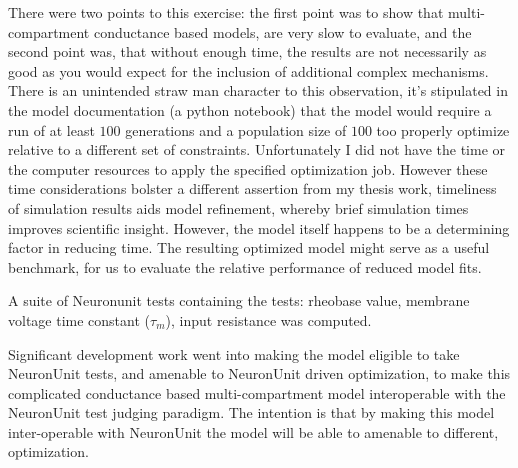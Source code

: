 
There were two points to this exercise: the first point was to show that multi-compartment conductance based models, are very slow to evaluate, and the second point was, that without enough time, the results are not necessarily as good as you would expect for the inclusion of additional complex mechanisms. There is an unintended straw man character to this observation, it's stipulated in the model documentation (a python notebook) that the model would require a run of at least $100$ generations and a population size of $100$ too properly optimize relative to a different set of constraints. Unfortunately I did not have the time or the computer resources to apply the specified optimization job. However these time considerations bolster a different assertion from my thesis work, timeliness of simulation results aids model refinement, whereby brief simulation times improves scientific insight.
However, the model itself happens to be a determining factor in reducing time. The resulting optimized model might serve as a useful benchmark, for us to evaluate the relative performance of reduced model fits. 

A suite of Neuronunit tests containing the tests: rheobase value, membrane voltage time constant ($\tau_{m}$), input resistance was computed. 

Significant development work went into making the model eligible to take NeuronUnit tests, and amenable to NeuronUnit driven optimization, to make this complicated conductance based multi-compartment model interoperable with the NeuronUnit test judging paradigm.
The intention is that by making this model inter-operable with NeuronUnit the model will be able to amenable to different, optimization. 

